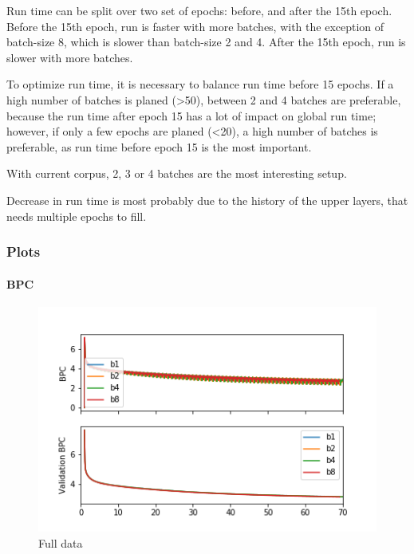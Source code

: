 \begin{longtable}[]{@{}lll@{}}
\bottomrule
\end{longtable}

Run time can be split over two set of epochs: before, and after the 15th
epoch. Before the 15th epoch, run is faster with more batches, with the
exception of batch-size 8, which is slower than batch-size 2 and 4.
After the 15th epoch, run is slower with more batches.

To optimize run time, it is necessary to balance run time before 15
epochs. If a high number of batches is planed (\textgreater{}50),
between 2 and 4 batches are preferable, because the run time after epoch
15 has a lot of impact on global run time; however, if only a few epochs
are planed (\textless{}20), a high number of batches is preferable, as
run time before epoch 15 is the most important.

With current corpus, 2, 3 or 4 batches are the most interesting setup.

Decrease in run time is most probably due to the history of the upper
layers, that needs multiple epochs to fill.

\subsubsection{Plots}\label{plots}

\paragraph{BPC}\label{bpc}

\begin{figure}
\centering
\includegraphics{b1a8_frac.png}
\caption{Full data}
\end{figure}


